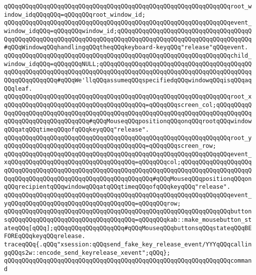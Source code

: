 \verb|qQQqqQQqqQQqqQQqqQQqqQQqqQQqqQQqqQQqqQQqqQQqqQQqqQQqqQQqqQQqqQQqroot_window_idqQQqqQQq=qQQqqQQqroot_window_id;|\newline
\verb|qQQqqQQqqQQqqQQqqQQqqQQqqQQqqQQqqQQqqQQqqQQqqQQqqQQqqQQqqQQqqQQqevent_window_idqQQq=qQQqqQQqwindow_id;qQQqqQQqqQQqqQQqqQQqqQQqqQQqqQQqqQQqqQQqqQQqqQQqqQQqqQQqqQQqqQQqqQQqqQQqqQQqqQQqqQQqqQQqqQQqqQQqqQQqqQQqqQQq#qQQqWindowqQQqhandlingqQQqtheqQQqkeyboard-keyqQQq"release"qQQqevent.|\newline
\verb|qQQqqQQqqQQqqQQqqQQqqQQqqQQqqQQqqQQqqQQqqQQqqQQqqQQqqQQqqQQqqQQqchild_window_idqQQq=qQQqqQQqNULL;qQQqqQQqqQQqqQQqqQQqqQQqqQQqqQQqqQQqqQQqqQQqqQQqqQQqqQQqqQQqqQQqqQQqqQQqqQQqqQQqqQQqqQQqqQQqqQQqqQQqqQQqqQQqqQQqqQQqqQQqqQQqqQQq#qQQqWe'llqQQqassumeqQQqspecifiedqQQqwindowqQQqisqQQqaqQQqleaf.|\newline
\verb|qQQqqQQqqQQqqQQqqQQqqQQqqQQqqQQqqQQqqQQqqQQqqQQqqQQqqQQqqQQqqQQqroot_xqQQqqQQqqQQqqQQqqQQqqQQqqQQqqQQqqQQqqQQq=qQQqqQQqscreen_col;qQQqqQQqqQQqqQQqqQQqqQQqqQQqqQQqqQQqqQQqqQQqqQQqqQQqqQQqqQQqqQQqqQQqqQQqqQQqqQQqqQQqqQQqqQQqqQQqqQQqqQQq#qQQqMouseqQQqpositionqQQqonqQQqrootqQQqwindowqQQqatqQQqtimeqQQqofqQQqkeyqQQq"release".|\newline
\verb|qQQqqQQqqQQqqQQqqQQqqQQqqQQqqQQqqQQqqQQqqQQqqQQqqQQqqQQqqQQqqQQqroot_yqQQqqQQqqQQqqQQqqQQqqQQqqQQqqQQqqQQqqQQq=qQQqqQQqscreen_row;|\newline
\verb|qQQqqQQqqQQqqQQqqQQqqQQqqQQqqQQqqQQqqQQqqQQqqQQqqQQqqQQqqQQqqQQqevent_xqQQqqQQqqQQqqQQqqQQqqQQqqQQqqQQqqQQq=qQQqqQQqcol;qQQqqQQqqQQqqQQqqQQqqQQqqQQqqQQqqQQqqQQqqQQqqQQqqQQqqQQqqQQqqQQqqQQqqQQqqQQqqQQqqQQqqQQqqQQqqQQqqQQqqQQqqQQqqQQqqQQqqQQqqQQqqQQqqQQq#qQQqMouseqQQqpositionqQQqonqQQqrecipientqQQqwindowqQQqatqQQqtimeqQQqofqQQqkeyqQQq"release".|\newline
\verb|qQQqqQQqqQQqqQQqqQQqqQQqqQQqqQQqqQQqqQQqqQQqqQQqqQQqqQQqqQQqqQQqevent_yqQQqqQQqqQQqqQQqqQQqqQQqqQQqqQQqqQQq=qQQqqQQqrow;|\newline
\verb|qQQqqQQqqQQqqQQqqQQqqQQqqQQqqQQqqQQqqQQqqQQqqQQqqQQqqQQqqQQqqQQqbuttonsqQQqqQQqqQQqqQQqqQQqqQQqqQQqqQQqqQQq=qQQqqQQqkab::make_mousebutton_stateqQQq[qQQq];qQQqqQQqqQQqqQQqqQQq#qQQqMouseqQQqbuttonsqQQqstateqQQqBEFOREqQQqkeyqQQqrelease.|\newline
\newline
\verb|traceqQQq{.qQQq"xsession:qQQqsend_fake_key_release_event/YYYqQQqcallingqQQqs2w::encode_send_keyrelease_xevent";qQQq};|\newline
\verb|qQQqqQQqqQQqqQQqqQQqqQQqqQQqqQQqqQQqqQQqqQQqqQQqqQQqqQQqqQQqqQQqcommand|\newline
